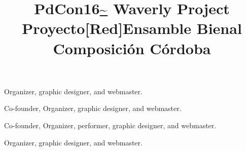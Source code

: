 \title{ PdCon16\url{~} }
\begin{position} 
Organizer, graphic designer, and webmaster.
\end{position}

\title{ Waverly Project }
\begin{position}
Co-founder, Organizer, graphic designer, and webmaster.
\end{position}

\title{ Proyecto[Red]Ensamble }
\begin{position} 
Co-founder, Organizer, performer, graphic designer, and webmaster.
\end{position}

\title{ Bienal Composición Córdoba }
\begin{position} 
Organizer, graphic designer, and webmaster.
\end{position}